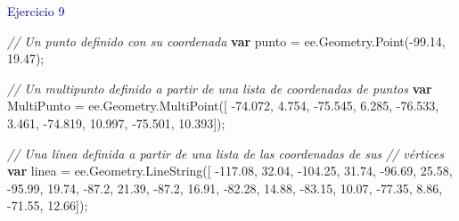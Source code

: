 \documentclass[
  12pt,
  letterpaper,
  twoside]{book}
\newenvironment{Shaded}{\begin{snugshade}}{\end{snugshade}}
\newcommand{\AttributeTok}[1]{\textcolor[rgb]{0.48,0.12,0.64}{#1}}
\newcommand{\CommentTok}[1]{\textcolor[rgb]{0.24,0.58,0.00}{\textit{#1}}}
\newcommand{\ControlFlowTok}[1]{\textcolor[rgb]{0.00,0.00,0.00}{\textbf{#1}}}
\newcommand{\FloatTok}[1]{\textcolor[rgb]{0.28,0.53,0.93}{#1}}
\newcommand{\FunctionTok}[1]{\textcolor[rgb]{0.48,0.12,0.64}{#1}}
\newcommand{\KeywordTok}[1]{\textcolor[rgb]{0.48,0.12,0.64}{#1}}
\newcommand{\NormalTok}[1]{#1}
\newcommand{\OperatorTok}[1]{\textcolor[rgb]{0.00,0.00,0.00}{#1}}
\begin{document}
\textcolor{darkblue}{Ejercicio 9}

\begin{Shaded}
\begin{Highlighting}[]
\CommentTok{// Un punto definido con su coordenada  }
\ControlFlowTok{var}\NormalTok{ punto }\OperatorTok{=} \KeywordTok{ee}\OperatorTok{.}\AttributeTok{Geometry}\OperatorTok{.}\FunctionTok{Point}\NormalTok{(}\OperatorTok{{-}}\FloatTok{99.14}\OperatorTok{,} \FloatTok{19.47}\NormalTok{)}\OperatorTok{;} 

\CommentTok{// Un multipunto definido a partir de una lista de coordenadas de puntos}
\ControlFlowTok{var}\NormalTok{ MultiPunto }\OperatorTok{=} \KeywordTok{ee}\OperatorTok{.}\AttributeTok{Geometry}\OperatorTok{.}\FunctionTok{MultiPoint}\NormalTok{([     }
  \OperatorTok{{-}}\FloatTok{74.072}\OperatorTok{,} \FloatTok{4.754}\OperatorTok{,}                              
  \OperatorTok{{-}}\FloatTok{75.545}\OperatorTok{,} \FloatTok{6.285}\OperatorTok{,}                             
  \OperatorTok{{-}}\FloatTok{76.533}\OperatorTok{,} \FloatTok{3.461}\OperatorTok{,}
  \OperatorTok{{-}}\FloatTok{74.819}\OperatorTok{,} \FloatTok{10.997}\OperatorTok{,}
  \OperatorTok{{-}}\FloatTok{75.501}\OperatorTok{,} \FloatTok{10.393}\NormalTok{])}\OperatorTok{;}

\CommentTok{// Una línea definida a partir de una lista de las coordenadas de sus }
\CommentTok{// vértices}
\ControlFlowTok{var}\NormalTok{ linea }\OperatorTok{=} \KeywordTok{ee}\OperatorTok{.}\AttributeTok{Geometry}\OperatorTok{.}\FunctionTok{LineString}\NormalTok{([ }
  \OperatorTok{{-}}\FloatTok{117.08}\OperatorTok{,} \FloatTok{32.04}\OperatorTok{,}                    
  \OperatorTok{{-}}\FloatTok{104.25}\OperatorTok{,} \FloatTok{31.74}\OperatorTok{,}                    
  \OperatorTok{{-}}\FloatTok{96.69}\OperatorTok{,} \FloatTok{25.58}\OperatorTok{,}
  \OperatorTok{{-}}\FloatTok{95.99}\OperatorTok{,} \FloatTok{19.74}\OperatorTok{,}
  \OperatorTok{{-}}\FloatTok{87.2}\OperatorTok{,} \FloatTok{21.39}\OperatorTok{,}
  \OperatorTok{{-}}\FloatTok{87.2}\OperatorTok{,} \FloatTok{16.91}\OperatorTok{,}
  \OperatorTok{{-}}\FloatTok{82.28}\OperatorTok{,} \FloatTok{14.88}\OperatorTok{,}
  \OperatorTok{{-}}\FloatTok{83.15}\OperatorTok{,} \FloatTok{10.07}\OperatorTok{,}
  \OperatorTok{{-}}\FloatTok{77.35}\OperatorTok{,} \FloatTok{8.86}\OperatorTok{,}
  \OperatorTok{{-}}\FloatTok{71.55}\OperatorTok{,} \FloatTok{12.66}\NormalTok{])}\OperatorTok{;} 


\end{Highlighting}
\end{Shaded}
\end{document}
